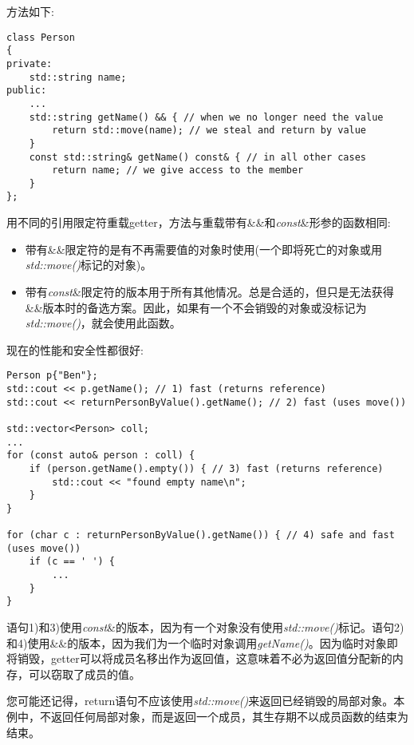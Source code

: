 方法如下:\par

\begin{lstlisting}[caption={}]
class Person
{
private:
	std::string name;
public:
	...
	std::string getName() && { // when we no longer need the value
		return std::move(name); // we steal and return by value
	}
	const std::string& getName() const& { // in all other cases
		return name; // we give access to the member
	}
};
\end{lstlisting}

用不同的引用限定符重载getter，方法与重载带有\&\&和\textit{const}\&形参的函数相同:\par

\begin{itemize}
	\item 带有\&\&限定符的是有不再需要值的对象时使用(一个即将死亡的对象或用\textit{std::move()}标记的对象)。
	\item 带有\textit{const}\&限定符的版本用于所有其他情况。总是合适的，但只是无法获得\&\&版本时的备选方案。因此，如果有一个不会销毁的对象或没标记为\textit{std::move()}，就会使用此函数。
\end{itemize}

现在的性能和安全性都很好:\par

\begin{lstlisting}[caption={}]
Person p{"Ben"};
std::cout << p.getName(); // 1) fast (returns reference)
std::cout << returnPersonByValue().getName(); // 2) fast (uses move())

std::vector<Person> coll;
...
for (const auto& person : coll) {
	if (person.getName().empty()) { // 3) fast (returns reference)
		std::cout << "found empty name\n";
	}
}

for (char c : returnPersonByValue().getName()) { // 4) safe and fast (uses move())
	if (c == ' ') {
		...
	}
}
\end{lstlisting}

语句1)和3)使用\textit{const}\&的版本，因为有一个对象没有使用\textit{std::move()}标记。语句2)和4)使用\&\&的版本，因为我们为一个临时对象调用\textit{getName()}。因为临时对象即将销毁，getter可以将成员名移出作为返回值，这意味着不必为返回值分配新的内存，可以窃取了成员的值。\par

您可能还记得，return语句不应该使用\textit{std::move()}来返回已经销毁的局部对象。本例中，不返回任何局部对象，而是返回一个成员，其生存期不以成员函数的结束为结束。\par

